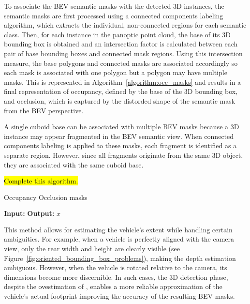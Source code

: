 To associate the BEV semantic masks with the detected 3D instances, the semantic masks are first processed using a connected components labeling algorithm, which extracts the individual, non-connected regions for each semantic class. Then, for each instance in the panoptic point cloud, the base of its 3D bounding box is obtained and an intersection factor is calculated between each pair of base bounding boxes and connected mask regions. Using this intersection measure, the base polygons and connected masks are associated accordingly so each mask is associated with one polygon but a polygon may have multiple masks. This is represented in Algorithm~\ref{algorithm:occ_masks} and results in a final representation of occupancy, defined by the base of the 3D bounding box, and occlusion, which is captured by the distorded shape of the semantic mask from the BEV perspective.

A single cuboid base can be associated with multiple BEV masks because a 3D instance may appear fragmented in the BEV semantic view. When connected components labeling is applied to these masks, each fragment is identified as a separate region. However, since all fragments originate from the same 3D object, they are associated with the same cuboid base.

\hl{Complete this algorithm.}
\begin{algorithm}
    \caption{Occupancy Occlusion masks}
    \label{algorithm:occ_masks}
    \footnotesize

    \begin{algorithmic}[1]
        \State \textbf{Input:} 
        \State \textbf{Output:} 
        \State \Return $x$
    \end{algorithmic}
\end{algorithm}

This method allows for estimating the vehicle’s extent while handling certain ambiguities. For example, when a vehicle is perfectly aligned with the camera view, only the rear width and height are clearly visible (see Figure~\ref{fig:oriented_bounding_box_problems}), making the depth estimation ambiguous. However, when the vehicle is rotated relative to the camera, its dimensions become more discernible. In such cases, the 3D detection phase, despite the ovestimation of , enables a more reliable approximation of the vehicle's actual footprint improving the accuracy of the resulting BEV masks.

